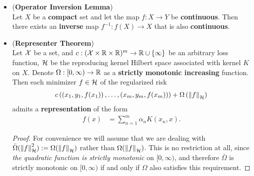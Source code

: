 \documentclass[11pt]{article}
\begin{document}
\begin{itemize}
\item \begin{lemma}(\textbf{Operator Inversion Lemma}) \citep{scholkopf2001learning}\\
 Let $X$ be a \textbf{compact} set and let the map $f : X \rightarrow Y$ be \textbf{continuous}. Then there exists an \textbf{inverse} map $f^{-1}: f(X) \rightarrow X$
that is also \textbf{continuous}.
\end{lemma}

\item \begin{theorem} (\textbf{Representer Theorem}) \citep{scholkopf2001learning}\\
Let ${\mathcal X}$ be a set, and $c: ({\mathcal X} \times {\mathbb R} \times {\mathbb R})^m \to {\mathbb R} \cup \left\{\infty\right\}$ be an arbitrary loss function, ${\mathcal H}$ be the reproducing kernel Hilbert space associated with kernel $K$ on $X$. Denote $\Omega: [0, \infty) \rightarrow {\mathbb R}$ as a \textbf{strictly} \textbf{monotonic increasing} function. Then each minimizer $f \in {\mathcal H}$ of the regularized risk
\begin{align}
c\left((x_1, y_1, f(x_1)) \,{,}\ldots{,}\,  (x_m, y_m, f(x_m))\right)+  \Omega\left(\left\|f\right\|_{{\mathcal H}}\right) \label{eqn: representer_theorem_risk_functional}
\end{align}
admits a \textbf{representation} of the form
\begin{align*}
f(x) &= \sum_{n=1}^{m}\alpha_n K(x_n, x).
\end{align*}
\end{theorem}
\begin{proof}
For convenience we will assume that we are dealing with $\bar{\Omega}(\left\|f\right\|_{{\mathcal H}}^2) := \Omega(\left\|f\right\|_{{\mathcal H}})$ rather than $\Omega(\left\|f\right\|_{{\mathcal H}})$. This is no restriction at all, since \emph{the quadratic function is strictly monotonic} on $[0, \infty)$, and therefore $\bar{\Omega}$ is strictly monotonic on $[0, \infty)$ if
and only if $\Omega$ also satisfies this requirement.


\end{proof}
\end{itemize}
\end{document}
